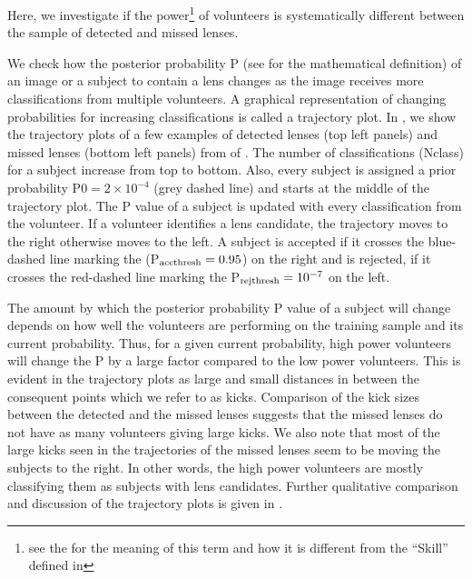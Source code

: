 \documentclass[useAMS,usenatbib,a4paper]{mn2e}
\begin{document}
Here, we investigate if the power\footnote{see the
 for the meaning of this term and how it is
different from the ``Skill'' defined in \PaperOne} of volunteers is systematically
different between the sample of detected and missed lenses.

We check how the posterior probability P (see \PaperOne for the
mathematical definition) of an image or a subject to contain a lens
changes as the image receives more classifications from multiple
volunteers. A graphical representation of changing probabilities for
increasing classifications is called a trajectory plot. In
, we show the trajectory plots of a few examples of
detected lenses (top left panels) and missed lenses (bottom left panels)
from \StageOne of \sw. The number of classifications (Nclass) for a
subject increase from top to bottom.  Also, every subject is assigned a
prior probability P0$=2\times10^{-4}$ (grey dashed line) and starts at
the middle of the trajectory plot. The P value of a subject is updated
with every classification from the volunteer.  If a volunteer identifies
a lens candidate, the trajectory moves to the right otherwise moves to
the left. A subject is accepted if it crosses the blue-dashed line
marking the (P$_{\rm acc thresh}=0.95$) on the right and is rejected, if
it crosses the red-dashed line marking the P$_{\rm rej thresh}=10^{-7}$
on the left.

The amount by which the posterior probability P value of a subject will
change depends on how well the volunteers are performing on the training
sample and its current probability. Thus, for a given current
probability, high power volunteers will change the P by a large factor
compared to the low power volunteers. This is evident in the trajectory
plots as large and small distances in between the consequent points
which we refer to as kicks. Comparison of the kick sizes between the
detected and the missed lenses suggests that the missed lenses do not
have as many volunteers giving large kicks. We also note that most of
the large kicks seen in the trajectories of the missed lenses seem to be
moving the subjects to the right. In other words, the high power
volunteers are mostly classifying them as subjects with lens candidates.
Further qualitative comparison and discussion of the trajectory plots is
given in .
\end{document}
